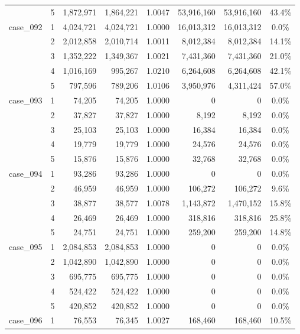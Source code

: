 \begin{footnotesize}
\begin{longtable}{l c rr c rr c}
 & 5 & 1{,}872{,}971 & 1{,}864{,}221 & 1.0047 & 53{,}916{,}160 & 53{,}916{,}160 & 43.4\% \\
\addlinespace[2pt]
case\_092 & 1 & 4{,}024{,}721 & 4{,}024{,}721 & 1.0000 & 16{,}013{,}312 & 16{,}013{,}312 & 0.0\% \\
 & 2 & 2{,}012{,}858 & 2{,}010{,}714 & 1.0011 & 8{,}012{,}384 & 8{,}012{,}384 & 14.1\% \\
 & 3 & 1{,}352{,}222 & 1{,}349{,}367 & 1.0021 & 7{,}431{,}360 & 7{,}431{,}360 & 21.0\% \\
 & 4 & 1{,}016{,}169 & 995{,}267 & 1.0210 & 6{,}264{,}608 & 6{,}264{,}608 & 42.1\% \\
 & 5 & 797{,}596 & 789{,}206 & 1.0106 & 3{,}950{,}976 & 4{,}311{,}424 & 57.0\% \\
\addlinespace[2pt]
case\_093 & 1 & 74{,}205 & 74{,}205 & 1.0000 & 0 & 0 & 0.0\% \\
 & 2 & 37{,}827 & 37{,}827 & 1.0000 & 8{,}192 & 8{,}192 & 0.0\% \\
 & 3 & 25{,}103 & 25{,}103 & 1.0000 & 16{,}384 & 16{,}384 & 0.0\% \\
 & 4 & 19{,}779 & 19{,}779 & 1.0000 & 24{,}576 & 24{,}576 & 0.0\% \\
 & 5 & 15{,}876 & 15{,}876 & 1.0000 & 32{,}768 & 32{,}768 & 0.0\% \\
\addlinespace[2pt]
case\_094 & 1 & 93{,}286 & 93{,}286 & 1.0000 & 0 & 0 & 0.0\% \\
 & 2 & 46{,}959 & 46{,}959 & 1.0000 & 106{,}272 & 106{,}272 & 9.6\% \\
 & 3 & 38{,}877 & 38{,}577 & 1.0078 & 1{,}143{,}872 & 1{,}470{,}152 & 15.8\% \\
 & 4 & 26{,}469 & 26{,}469 & 1.0000 & 318{,}816 & 318{,}816 & 25.8\% \\
 & 5 & 24{,}751 & 24{,}751 & 1.0000 & 259{,}200 & 259{,}200 & 14.8\% \\
\addlinespace[2pt]
case\_095 & 1 & 2{,}084{,}853 & 2{,}084{,}853 & 1.0000 & 0 & 0 & 0.0\% \\
 & 2 & 1{,}042{,}890 & 1{,}042{,}890 & 1.0000 & 0 & 0 & 0.0\% \\
 & 3 & 695{,}775 & 695{,}775 & 1.0000 & 0 & 0 & 0.0\% \\
 & 4 & 524{,}422 & 524{,}422 & 1.0000 & 0 & 0 & 0.0\% \\
 & 5 & 420{,}852 & 420{,}852 & 1.0000 & 0 & 0 & 0.0\% \\
\addlinespace[2pt]
case\_096 & 1 & 76{,}553 & 76{,}345 & 1.0027 & 168{,}460 & 168{,}460 & 10.5\% \\

\end{longtable}
\end{footnotesize}
